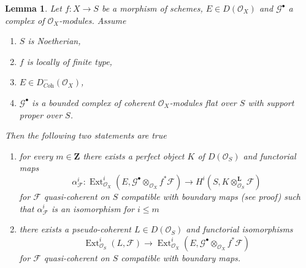 \documentclass{stacks-project}
\theoremstyle{plain}
\newtheorem{lemma}[subsection]{Lemma}
\theoremstyle{definition}
\theoremstyle{remark}
\numberwithin{equation}{subsection}
\def\Ext{\mathop{\mathrm{Ext}}\nolimits}
\begin{document}
\begin{lemma}
\label{lemma-compute-ext}
Let $f : X \to S$ be a morphism of schemes, $E \in D(\mathcal{O}_X)$
and $\mathcal{G}^\bullet$ a complex of $\mathcal{O}_X$-modules.
Assume
\begin{enumerate}
\item $S$ is Noetherian,
\item $f$ is locally of finite type,
\item $E \in D^-_{\textit{Coh}}(\mathcal{O}_X)$,
\item $\mathcal{G}^\bullet$ is a bounded complex of
coherent $\mathcal{O}_X$-modules flat over $S$ with support proper over $S$.
\end{enumerate}
Then the following two statements are true
\begin{enumerate}
\item[(A)] for every $m \in \mathbf{Z}$ there exists a perfect object $K$
of $D(\mathcal{O}_S)$ and functorial maps
$$
\alpha^i_\mathcal{F} :
\Ext^i_{\mathcal{O}_X}(E,
\mathcal{G}^\bullet \otimes_{\mathcal{O}_X} f^*\mathcal{F})
\longrightarrow
H^i(S, K \otimes^\mathbf{L}_{\mathcal{O}_S} \mathcal{F})
$$
for $\mathcal{F}$ quasi-coherent on $S$ compatible with boundary maps
(see proof) such that $\alpha^i_\mathcal{F}$ is an isomorphism for $i \leq m$
\item[(B)] there exists a pseudo-coherent $L \in D(\mathcal{O}_S)$
and functorial isomorphisms
$$
\Ext^i_{\mathcal{O}_S}(L, \mathcal{F}) \longrightarrow
\Ext^i_{\mathcal{O}_X}(E,
\mathcal{G}^\bullet \otimes_{\mathcal{O}_X} f^*\mathcal{F})
$$
for $\mathcal{F}$ quasi-coherent on $S$ compatible with boundary maps.
\end{enumerate}
\end{lemma}
\end{document}
